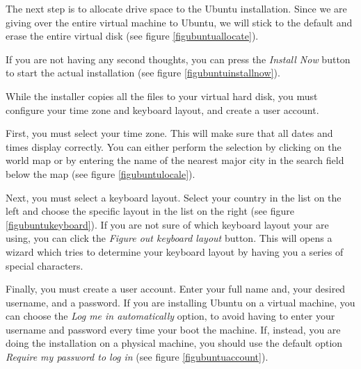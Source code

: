 \documentclass[draft,ebook,10pt,twoside,openright]{memoir}
\begin{document}

The next step is to allocate drive space to the Ubuntu installation. Since we are giving over the entire virtual machine to Ubuntu, we will stick to the default and erase the entire virtual disk (see figure \ref{figubuntuallocate}).


If you are not having any second thoughts, you can press the \emph{Install Now} button to start the actual installation (see figure \ref{figubuntuinstallnow}).


While the installer copies all the files to your virtual hard disk, you must configure your time zone and keyboard layout, and create a user account.

First, you must select your time zone. This will make sure that all dates and times display correctly. You can either perform the selection by clicking on the world map or by entering the name of the nearest major city in the search field below the map (see figure \ref{figubuntulocale}).


Next, you must select a keyboard layout. Select your country in the list on the left and choose the specific layout in the list on the right (see figure \ref{figubuntukeyboard}). If you are not sure of which keyboard layout your are using, you can click the \emph{Figure out keyboard layout} button. This will opens a wizard which tries to determine your keyboard layout by having you a series of special characters.


Finally, you must create a user account. Enter your full name and, your desired username, and a password. If you are installing Ubuntu on a virtual machine, you can choose the \emph{Log me in automatically} option, to avoid having to enter your username and password every time your boot the machine. If, instead, you are doing the installation on a physical machine, you should use the default option \emph{Require my password to log in} (see figure \ref{figubuntuaccount}).
\end{document}
